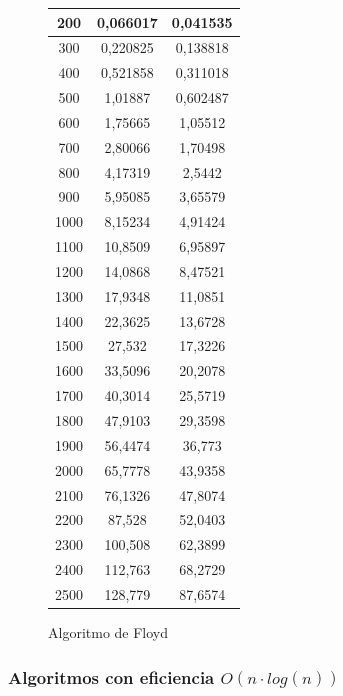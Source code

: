\documentclass[12pt,spanish]{article}
\begin{document}
\begin{figure}[H]
\begin{tabular}{|c|c|c|}
\hline
200 & 0,066017 & 0,041535\\
\hline
300 & 0,220825 & 0,138818\\
\hline
400 & 0,521858 & 0,311018\\
\hline
500 & 1,01887 & 0,602487\\
\hline
600 & 1,75665 & 1,05512\\
\hline
700 & 2,80066 & 1,70498\\
\hline
800 & 4,17319 & 2,5442\\
\hline
900 & 5,95085 & 3,65579\\
\hline
1000 & 8,15234 & 4,91424\\
\hline
1100 & 10,8509 & 6,95897\\
\hline
1200 & 14,0868 & 8,47521\\
\hline
1300 & 17,9348 & 11,0851\\
\hline
1400 & 22,3625 & 13,6728\\
\hline
1500 & 27,532 & 17,3226\\
\hline
1600 & 33,5096 & 20,2078\\
\hline
1700 & 40,3014 & 25,5719\\
\hline
1800 & 47,9103 & 29,3598\\
\hline
1900 & 56,4474 & 36,773\\
\hline
2000 & 65,7778 & 43,9358\\
\hline
2100 & 76,1326 & 47,8074\\
\hline
2200 & 87,528 & 52,0403\\
\hline
2300 & 100,508 & 62,3899\\
\hline
2400 & 112,763 & 68,2729\\
\hline
2500 & 128,779 & 87,6574\\
\hline
\end{tabular}
\caption{Algoritmo de Floyd}
\end{figure}

\subsubsection{Algoritmos con eficiencia $O(n \cdot log(n))$}
\end{document}

